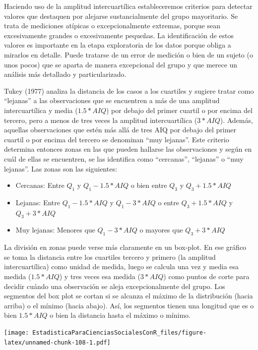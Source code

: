 \documentclass[]{book}
\providecommand{\tightlist}{%
  \setlength{\itemsep}{0pt}\setlength{\parskip}{0pt}}
\begin{document}
Haciendo uso de la amplitud intercuartílica estableceremos criterios
para detectar valores que destaquen por alejarse sustancialmente del
grupo mayoritario. Se trata de mediciones atípicas o excepcionalmente
extremas, porque sean excesivamente grandes o excesivamente pequeñas. La
identificación de estos valores es importante en la etapa exploratoria
de los datos porque obliga a mirarlos en detalle. Puede tratarse de un
error de medición o bien de un sujeto (o unos pocos) que se aparta de
manera excepcional del grupo y que merece un análisis más detallado y
particularizado.

Tukey (1977) analiza la distancia de los casos a los cuartiles y sugiere
tratar como ``lejanas'' a las observaciones que se encuentren a más de una
amplitud intercuartílica y media (\(1.5*AIQ\)) por debajo del primer
cuartil o por encima del tercero, pero a menos de tres veces la amplitud
intercuartílica (\(3*AIQ\)). Además, aquellas observaciones que estén más
allá de tres AIQ por debajo del primer cuartil o por encima del tercero
se denominan ``muy lejanas''. Este criterio determina entonces zonas en
las que pueden hallarse las observaciones y según en cuál de ellas se
encuentren, se las identifica como ``cercanas'', ``lejanas'' o ``muy
lejanas''. Las zonas son las siguientes:

\begin{itemize}
\tightlist
\item
  Cercanas: Entre \(Q_1\) y \(Q_1-1.5*AIQ\) o bien entre \(Q_3\) y \(Q_3+1.5*AIQ\)
\item
  Lejanas: Entre \(Q_1-1.5*AIQ\) y \(Q_1-3*AIQ\) o entre \(Q_3+1.5*AIQ\) y \(Q_3+3*AIQ\)
\item
  Muy lejanas: Menores que \(Q_1-3*AIQ\) o mayores que \(Q_3+3*AIQ\)
\end{itemize}

La división en zonas puede verse más claramente en un box-plot. En ese gráfico se toma la distancia entre los cuartiles tercero y
primero (la amplitud intercuartílica) como unidad de medida, luego se calcula una vez y media esa medida (\(1.5*AIQ\)) y tres veces esa
medida (\(3*AIQ\)) como puntos de corte para decidir cuándo una observación se aleja excepcionalmente del grupo. Los segmentos del box plot se cortan si se alcanza el máximo de la distribución (hacia arriba) o el mínimo (hacia abajo). Así, los segmentos tienen una longitud que es o bien \(1.5*AIQ\) o bien la distancia hasta el máximo o mínimo.

\texttt{[image: EstadisticaParaCienciasSocialesConR\_files/figure-latex/unnamed-chunk-108-1.pdf]}
\end{document}
